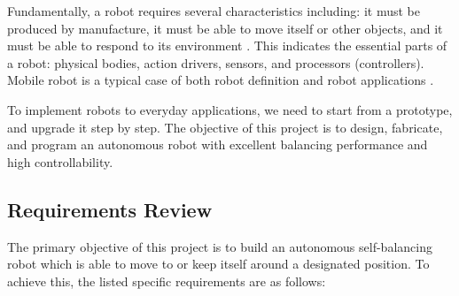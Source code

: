\documentclass[9pt,a4paper,twocolumn]{tau-class/tau}
\begin{document}
Fundamentally, a robot requires several characteristics including: it must be produced by manufacture, it must be able to move itself or other objects, and it must be able to respond to its environment \cite{fundamental_todd_2012}. This indicates the essential parts of a robot: physical bodies, action drivers, sensors, and processors (controllers). Mobile robot is a typical case of both robot definition and robot applications \cite{mobile_robot_tzafestas_2018, mobile_robot_raj_2022}. 

To implement robots to everyday applications, we need to start from a prototype, and upgrade it step by step. The objective of this project is to design, fabricate, and program an autonomous robot with excellent balancing performance and high controllability. 

\subsection{Requirements Review}
\label{subsec:requirements_review}
The primary objective of this project is to build an autonomous self-balancing robot which is able to move to or keep itself around a designated position. To achieve this, the listed specific requirements are as follows:
\end{document}
